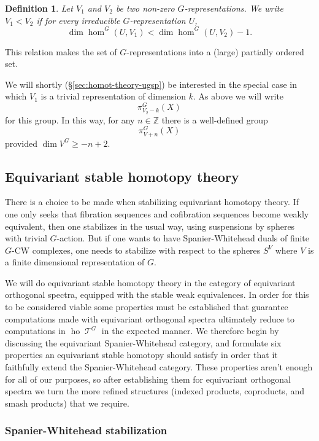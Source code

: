 \documentclass{amsart}
\newtheorem{definition}[equation]{Definition}
\newenvironment{defin}{\begin{definition}\rm}{\end{definition}}
\theoremstyle{definition}
\newtheorem{defin}[equation]{Definition}
\theoremstyle{remark}
\newcommand{\Z}{{\mathbb Z}}
\DeclareMathOperator{\ho}{ho}
\DeclareMathOperator{\spaces}{\mathcal T}
\newcommand{\ugspaces}[1]{\spaces^{#1}}
\begin{document}
\begin{defin}
\label{def:28} Let $V_{1}$ and $V_{2}$ be two non-zero $G$-representations.  We
write $V_{1}<V_{2}$ if for every irreducible $G$-representation $U$,
\[
\dim \hom^{G}(U,V_{1}) < \dim \hom^{G}(U, V_{2})-1.
\]
\end{defin}

This relation makes the set of $G$-representations into a (large) partially
ordered set.   

We will shortly (\S\ref{sec:homot-theory-ugsp}) be interested in the
special case in which $V_{1}$ is a trivial representation of dimension
$k$.  As above we will write
\[
\pi_{V_{2}-k}^{G}(X)
\]
for this group.   In this way, for any $n\in\Z$ there is a
well-defined group
\[
\pi_{V+n}^{G}(X)
\]
provided $\dim V^{G}\ge -n+2$.

\subsection{Equivariant stable homotopy theory}

There is a choice to be made when stabilizing equivariant homotopy
theory.  If one only seeks that fibration sequences and cofibration
sequences become weakly equivalent, then one stabilizes in the usual
way, using suspensions by spheres with trivial $G$-action.  But if one
wants to have Spanier-Whitehead duals of finite $G$-CW complexes, one
needs to stabilize with respect to the spheres $S^{V}$ where $V$ is a
finite dimensional representation of $G$.   

We will do equivariant stable homotopy theory in the category of
equivariant orthogonal spectra, equipped with the stable weak
equivalences.  In order for this to be considered viable some
properties must be established that guarantee computations made with
equivariant orthogonal spectra ultimately reduce to computations in
$\ho\ugspaces{G}$ in the expected manner.   We therefore begin by
discussing the equivariant Spanier-Whitehead category, and formulate
six properties an equivariant stable homotopy should satisfy in order
that it faithfully extend the Spanier-Whitehead category.   These properties
aren't enough for all of our purposes, so after establishing them for
equivariant orthogonal spectra we turn the more refined structures
(indexed products, coproducts, and smash products) that we require.



\subsubsection{Spanier-Whitehead stabilization}
\label{sec:g-spectra}
\end{document}
